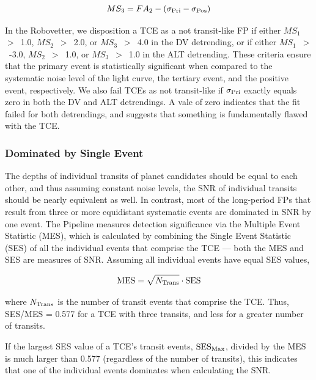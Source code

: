 \begin{equation}
    MS_{3} = FA_{2} - (\sigma_{\rm Pri} - \sigma_{\rm Pos})
\end{equation}

In the Robovetter, we disposition a TCE as a not transit-like FP if either $MS_{1}$~$>$~1.0, $MS_{2}$~$>$~2.0, or $MS_{3}$~$>$~4.0 in the DV detrending, or if either $MS_{1}$~$>$~-3.0, $MS_{2}$~$>$~1.0, or $MS_{3}$~$>$~1.0 in the ALT detrending. These criteria ensure that the primary event is statistically significant when compared to the systematic noise level of the light curve, the tertiary event, and the positive event, respectively. We also fail TCEs as not transit-like if $\sigma_{\rm Pri}$ exactly equals zero in both the DV and ALT detrendings. A vale of zero indicates that the fit failed for both detrendings, and suggests that something is fundamentally flawed with the TCE.


\subsubsection{Dominated by Single Event}
\label{s:sesmes}

The depths of individual transits of planet candidates should be equal to each other, and thus assuming constant noise levels, the SNR of individual transits should be nearly equivalent as well. In contrast, most of the long-period FPs that result from three or more equidistant systematic events are dominated in SNR by one event. The \kepler{} Pipeline measures detection significance via the Multiple Event Statistic (MES), which is calculated by combining the Single Event Statistic (SES) of all the individual events that comprise the TCE --- both the MES and SES are measures of SNR. Assuming all individual events have equal SES values,

\begin{equation}
{\rm MES} = \sqrt{N_{\rm Trans}} \cdot {\rm SES}
\end{equation}

\noindent where $N_{\rm Trans}$ is the number of transit events that comprise the TCE. Thus, SES/MES = 0.577 for a TCE with three transits, and less for a greater number of transits. 

If the largest SES value of a TCE's transit events, ${\rm SES}_{\rm Max}$, divided by the MES is much larger than 0.577 (regardless of the number of transits), this indicates that one of the individual events dominates when calculating the SNR.

